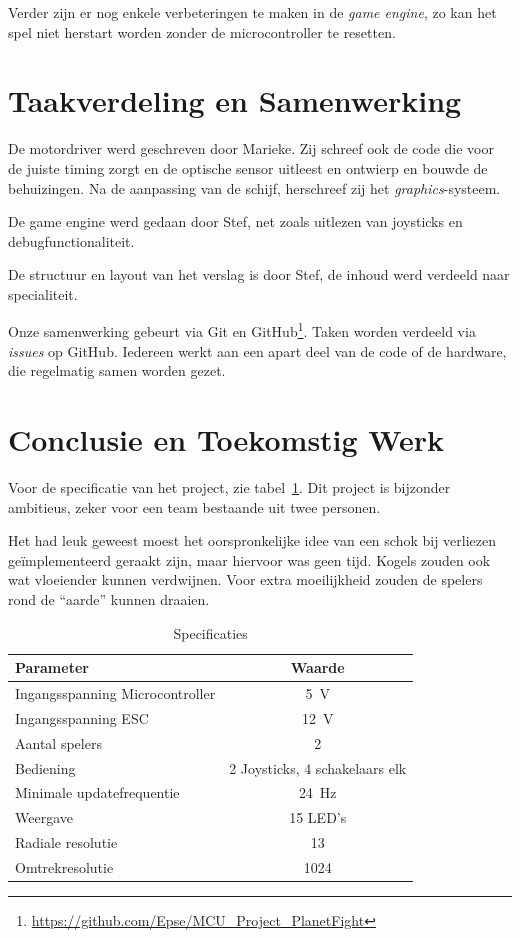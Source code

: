 \documentclass[12pt]{ugentreport}
\begin{document}
Verder zijn er nog enkele verbeteringen te maken in de \emph{game engine},
zo kan het spel niet herstart worden zonder de microcontroller te resetten.

\section{Taakverdeling en Samenwerking}
De motordriver werd geschreven door Marieke. Zij schreef ook de code die voor de
juiste timing zorgt en de optische sensor uitleest en ontwierp en bouwde de
behuizingen. Na de aanpassing van de schijf, herschreef zij het \emph{graphics}-systeem.

De game engine werd gedaan door Stef,
net zoals uitlezen van joysticks en debugfunctionaliteit.

De structuur en layout van het verslag is door Stef, de inhoud werd verdeeld
naar specialiteit.

Onze samenwerking gebeurt via Git en
GitHub\footnote{\url{https://github.com/Epse/MCU_Project_PlanetFight}}. Taken worden
verdeeld via \emph{issues} op GitHub. Iedereen werkt aan een apart deel van de
code of de hardware, die regelmatig samen worden gezet.

\section{Conclusie en Toekomstig Werk}
Voor de specificatie van het project, zie tabel~\ref{tbl:specs}.
Dit project is bijzonder ambitieus, zeker voor een team bestaande uit twee
personen.

Het had leuk geweest moest het oorspronkelijke idee van een schok bij verliezen
geïmplementeerd geraakt zijn, maar hiervoor was geen tijd. Kogels zouden ook wat
vloeiender kunnen verdwijnen. Voor extra moeilijkheid zouden de spelers rond  de
``aarde'' kunnen draaien.

\begin{table}
  \centering
  \begin{tabular}{l|c}
    \hline
    Parameter & Waarde\\
    \hline
    Ingangsspanning Microcontroller & \SI{5}{\volt}\\
    Ingangsspanning ESC & \SI{12}{\volt}\\
    Aantal spelers & 2\\
    Bediening & 2 Joysticks, 4 schakelaars elk\\
    Minimale updatefrequentie & \SI{24}{\hertz}\\
    Weergave & 15 LED's\\
    Radiale resolutie & 13\\
    Omtrekresolutie & 1024\\
    \hline
  \end{tabular}
  \caption{Specificaties}
  \label{tbl:specs}
\end{table}
\end{document}
